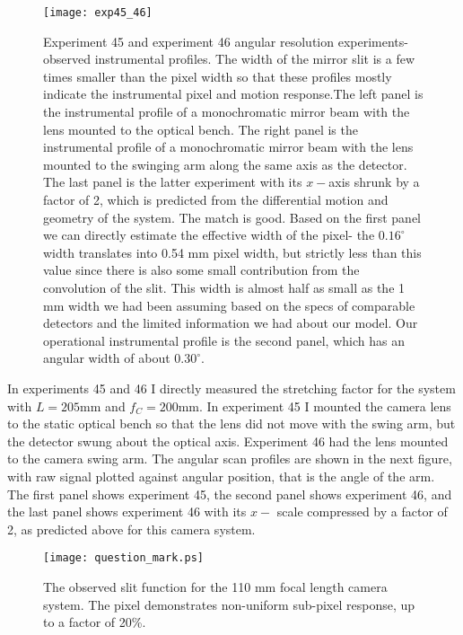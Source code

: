 \begin{figure}
\begin{center}
    \texttt{[image: exp45\_46]}
  \end{center}
  \caption[Angular resolution experiment]{Experiment 45 and experiment 46 angular resolution experiments- observed instrumental profiles.  The width of the mirror slit is a few times smaller than the pixel width so that these profiles mostly indicate the instrumental pixel and motion response.The left panel is the instrumental profile of a monochromatic mirror beam with the lens mounted to the optical bench.  The right panel is the instrumental profile of a monochromatic mirror beam with the lens mounted to the swinging arm along the same axis as the detector.  The last panel is the latter experiment with its $x-$axis shrunk by a factor of 2, which is predicted from the differential motion and geometry of the system.  The match is good.  Based on the first panel we can directly estimate the effective width of the pixel- the $0.16^\circ$ width translates into 0.54 mm pixel width, but strictly less than this value since there is also some small contribution from the convolution of the slit.  This width is almost half as small as the 1 mm width we had been assuming based on the specs of comparable detectors and the limited information we had about our model. Our operational instrumental profile is the second panel, which has an angular width of about $0.30^\circ$.}
\end{figure}

In experiments 45 and 46 I directly measured the stretching factor for the system with $L=205$mm and $f_C=200$mm.  In experiment 45 I mounted the camera lens to the static optical bench so that the lens did not move with the swing arm, but the detector swung about the optical axis.  Experiment 46 had the lens mounted to the camera swing arm.  The angular scan profiles are shown in the next figure, with raw signal plotted against angular position, that is the angle of the arm.  The first panel shows experiment 45, the second panel shows experiment 46, and the last panel shows experiment 46 with its $x-$ scale compressed by a factor of 2, as predicted above for this camera system.


\begin{figure}
\begin{center}
    \texttt{[image: question\_mark.ps]}
  \end{center}
  \caption[Observed and predicted slit functions]{The observed slit function for the 110 mm focal length camera system.  The pixel demonstrates non-uniform sub-pixel response, up to a factor of 20\%.}
\end{figure}




